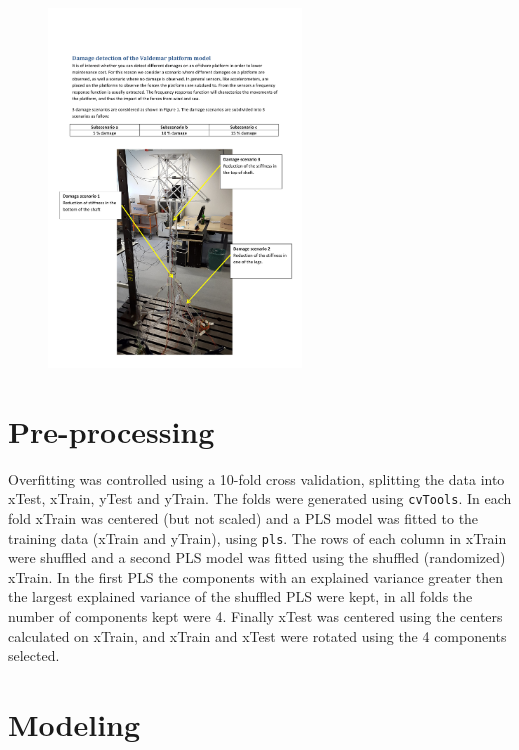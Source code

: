 \documentclass[a4paper,draft=false]{scrreprt}\usepackage[]{graphicx}\usepackage[]{color}
\begin{document}
\begin{figure}[hb]
\begin{center}
\includegraphics[width=0.6\textwidth]{Valdemarplatform}
\end{center}
\end{figure}

{\let\clearpage\relax \chapter{Pre-processing}}
Overfitting was controlled using a 10-fold cross validation, splitting the data into xTest, xTrain, yTest and yTrain. The folds were generated using \verb+cvTools+\cite{cvTools}. In each fold xTrain was centered (but not scaled) and a PLS model was fitted to the training data (xTrain and yTrain), using \verb+pls+\cite{pls}. The rows of each column in xTrain were shuffled and a second PLS model was fitted using the shuffled (randomized) xTrain. In the first PLS the components with an explained variance greater then the largest explained variance of the shuffled PLS were kept, in all folds the number of components kept were 4. Finally xTest was centered using the centers calculated on xTrain, and xTrain and xTest were rotated using the 4 components selected. 

{\let\clearpage\relax \chapter{Modeling}}
\end{document}

